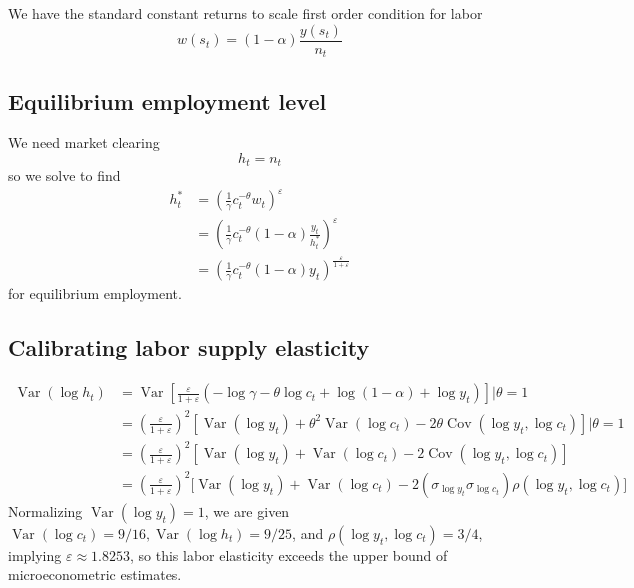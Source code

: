 \documentclass[11pt]{amsart}
\begin{document}
We have the standard constant returns to scale first order condition for labor 
\[
w(s_t) = (1-\alpha) \frac{y(s_t)}{n_t}
\]

\subsection{Equilibrium employment level}
We need market clearing 
\[
h_t = n_t
\] 
so we solve to find
\begin{align*}
h_t^{*} &= \left( \frac{1}{\gamma} c_t^{-\theta} w_t \right)^\varepsilon \\
&= \left( \frac{1}{\gamma} c_t^{-\theta} (1-\alpha) \frac{y_t}{h_t^{*}} \right)^\varepsilon \\
&= \left(  \frac{1}{\gamma} c_t^{-\theta} (1-\alpha) y_t  \right)^{\frac{\varepsilon}{1+\varepsilon}}
\end{align*}
for equilibrium employment.

\subsection{Calibrating labor supply elasticity}

\begin{align*}
\operatorname{Var}(\log h_t) &= \operatorname{Var} \left[ \frac{\varepsilon}{1+\varepsilon} \left( -\log \gamma -\theta \log c_t + \log (1-\alpha) + \log y_t  \right) \right] \vert \theta = 1 \\
& = \left( \frac{\varepsilon}{1+ \varepsilon}\right)^2 \left[ \operatorname{Var}(\log y_t) + \theta^2 \operatorname{Var}(\log c_t) - 2\theta \operatorname{Cov}(\log y_t, \log c_t) \right] \vert \theta = 1\\
& = \left( \frac{\varepsilon}{1+ \varepsilon}\right)^2 \left[ \operatorname{Var}(\log y_t) +  \operatorname{Var}(\log c_t) - 2 \operatorname{Cov}(\log y_t, \log c_t) \right] \\
& = \left( \frac{\varepsilon}{1+ \varepsilon}\right)^2 \Bigg[ \operatorname{Var}(\log y_t) +  \operatorname{Var}(\log c_t) - 2 \left( \sigma_{\log y_t} \sigma_{\log c_t} \right)\rho(\log y_t, \log c_t) \Bigg]
\end{align*}
Normalizing $\operatorname{Var}(\log y_t) = 1$, we are given $\operatorname{Var}(\log c_t) = 9/16, \operatorname{Var}(\log h_t) = 9/25$, and $\rho(\log y_t, \log c_t) = 3/4$, implying $\varepsilon \approx 1.8253$, so this labor elasticity exceeds the upper bound of microeconometric estimates.
\end{document}
